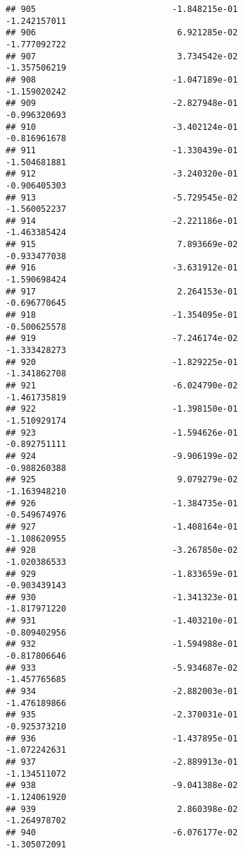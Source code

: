\documentclass[
]{article}
\begin{document}
\begin{verbatim}
## 905                           -1.848215e-01               -1.242157011
## 906                            6.921285e-02               -1.777092722
## 907                            3.734542e-02               -1.357506219
## 908                           -1.047189e-01               -1.159020242
## 909                           -2.827948e-01               -0.996320693
## 910                           -3.402124e-01               -0.816961678
## 911                           -1.330439e-01               -1.504681881
## 912                           -3.240320e-01               -0.906405303
## 913                           -5.729545e-02               -1.560052237
## 914                           -2.221186e-01               -1.463385424
## 915                            7.893669e-02               -0.933477038
## 916                           -3.631912e-01               -1.590698424
## 917                            2.264153e-01               -0.696770645
## 918                           -1.354095e-01               -0.500625578
## 919                           -7.246174e-02               -1.333428273
## 920                           -1.829225e-01               -1.341862708
## 921                           -6.024790e-02               -1.461735819
## 922                           -1.398150e-01               -1.510929174
## 923                           -1.594626e-01               -0.892751111
## 924                           -9.906199e-02               -0.988260388
## 925                            9.079279e-02               -1.163948210
## 926                           -1.384735e-01               -0.549674976
## 927                           -1.408164e-01               -1.108620955
## 928                           -3.267850e-02               -1.020386533
## 929                           -1.833659e-01               -0.903439143
## 930                           -1.341323e-01               -1.817971220
## 931                           -1.403210e-01               -0.809402956
## 932                           -1.594988e-01               -0.817806646
## 933                           -5.934687e-02               -1.457765685
## 934                           -2.882003e-01               -1.476189866
## 935                           -2.370031e-01               -0.925373210
## 936                           -1.437895e-01               -1.072242631
## 937                           -2.889913e-01               -1.134511072
## 938                           -9.041388e-02               -1.124061920
## 939                            2.860398e-02               -1.264978702
## 940                           -6.076177e-02               -1.305072091

\end{verbatim}
\end{document}

